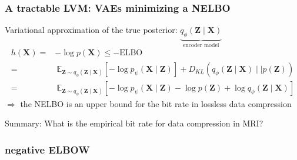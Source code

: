 \documentclass[
	11pt, %
	aspectratio=169, %
]{beamer}
\begin{document}
 \begin{frame}
	\frametitle{A tractable LVM: VAEs minimizing a NELBO}
	Variational approximation of the true posterior: $\underbrace{q_{\phi}(\mathbf{Z} \mid \mathbf{X})}_{\text{encoder model}}$
    \begin{align*}
       h(\mathbf{X}) =& -\log p(\mathbf{X}) \le -\text{ELBO}\\
        =&~\mathbb{E}_{\mathbf{Z} \sim q_\phi(\mathbf{Z}\mid \mathbf{X})} [- \log  p_\psi(\mathbf{X}  \mid \mathbf{Z})] + D_{KL}(q_\phi(\mathbf{Z}\mid \mathbf{X}) \mid\mid p(\mathbf{Z}))\\
        =&~ \mathbb{E}_{\mathbf{Z} \sim q_\phi(\mathbf{Z}\mid \mathbf{X})} [- \log  p_\psi(\mathbf{X}  \mid \mathbf{Z}) - \log  p(\mathbf{Z}) + \log q_\phi(\mathbf{Z}\mid \mathbf{X})] 
    \end{align*}
	$\Longrightarrow$ the NELBO is an upper bound for the bit rate in lossless data compression
\end{frame}





\begin{frame}[plain] %
	\begin{center}
		{\Huge Summary: What is the empirical bit rate for data compression in MRI?}
		
		\bigskip\bigskip %
		
	\end{center}
\end{frame}

 \begin{frame}
 \frametitle{negative ELBOW}
    \begin{figure}
        \begin{center}
        \end{center}
    \end{figure}
\end{frame}

\end{document}
